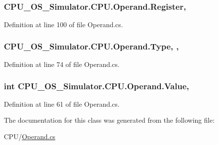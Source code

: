 \subsubsection[{Register}]{ C\+P\+U\+\_\+\+O\+S\+\_\+\+Simulator.\+C\+P\+U.\+Operand.\+Register\hspace{0.3cm}{\ttfamily [get]}, {\ttfamily [set]}}\label{class_c_p_u___o_s___simulator_1_1_c_p_u_1_1_operand_a8f08360f0e27922fc0377f5d58a9e67f}


Definition at line 100 of file Operand.\+cs.

\hypertarget{class_c_p_u___o_s___simulator_1_1_c_p_u_1_1_operand_a0b0deae57b760df3a083dc54535b0891}{}
\subsubsection[{Type}]{ C\+P\+U\+\_\+\+O\+S\+\_\+\+Simulator.\+C\+P\+U.\+Operand.\+Type\hspace{0.3cm}{\ttfamily [get]}, {\ttfamily [set]}, {\ttfamily [package]}}\label{class_c_p_u___o_s___simulator_1_1_c_p_u_1_1_operand_a0b0deae57b760df3a083dc54535b0891}


Definition at line 74 of file Operand.\+cs.

\hypertarget{class_c_p_u___o_s___simulator_1_1_c_p_u_1_1_operand_ab109292eba2094db4d7f21cbdbd5bc9e}{}
\subsubsection[{Value}]{\setlength{\rightskip}{0pt plus 5cm}int C\+P\+U\+\_\+\+O\+S\+\_\+\+Simulator.\+C\+P\+U.\+Operand.\+Value\hspace{0.3cm}{\ttfamily [get]}, {\ttfamily [set]}}\label{class_c_p_u___o_s___simulator_1_1_c_p_u_1_1_operand_ab109292eba2094db4d7f21cbdbd5bc9e}


Definition at line 61 of file Operand.\+cs.



The documentation for this class was generated from the following file\+:\begin{DoxyCompactItemize}
\item 
C\+P\+U/\hyperlink{_operand_8cs}{Operand.\+cs}\end{DoxyCompactItemize}
